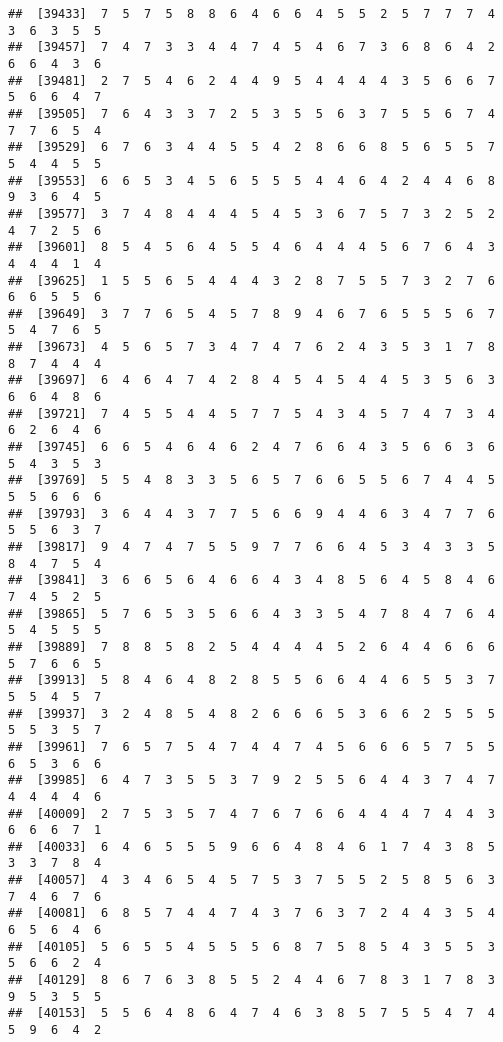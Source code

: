 \documentclass[
]{book}
\begin{document}
\begin{verbatim}
##  [39433]  7  5  7  5  8  8  6  4  6  6  4  5  5  2  5  7  7  7  4  3  6  3  5  5
##  [39457]  7  4  7  3  3  4  4  7  4  5  4  6  7  3  6  8  6  4  2  6  6  4  3  6
##  [39481]  2  7  5  4  6  2  4  4  9  5  4  4  4  4  3  5  6  6  7  5  6  6  4  7
##  [39505]  7  6  4  3  3  7  2  5  3  5  5  6  3  7  5  5  6  7  4  7  7  6  5  4
##  [39529]  6  7  6  3  4  4  5  5  4  2  8  6  6  8  5  6  5  5  7  5  4  4  5  5
##  [39553]  6  6  5  3  4  5  6  5  5  5  4  4  6  4  2  4  4  6  8  9  3  6  4  5
##  [39577]  3  7  4  8  4  4  4  5  4  5  3  6  7  5  7  3  2  5  2  4  7  2  5  6
##  [39601]  8  5  4  5  6  4  5  5  4  6  4  4  4  5  6  7  6  4  3  4  4  4  1  4
##  [39625]  1  5  5  6  5  4  4  4  3  2  8  7  5  5  7  3  2  7  6  6  6  5  5  6
##  [39649]  3  7  7  6  5  4  5  7  8  9  4  6  7  6  5  5  5  6  7  5  4  7  6  5
##  [39673]  4  5  6  5  7  3  4  7  4  7  6  2  4  3  5  3  1  7  8  8  7  4  4  4
##  [39697]  6  4  6  4  7  4  2  8  4  5  4  5  4  4  5  3  5  6  3  6  6  4  8  6
##  [39721]  7  4  5  5  4  4  5  7  7  5  4  3  4  5  7  4  7  3  4  6  2  6  4  6
##  [39745]  6  6  5  4  6  4  6  2  4  7  6  6  4  3  5  6  6  3  6  5  4  3  5  3
##  [39769]  5  5  4  8  3  3  5  6  5  7  6  6  5  5  6  7  4  4  5  5  5  6  6  6
##  [39793]  3  6  4  4  3  7  7  5  6  6  9  4  4  6  3  4  7  7  6  5  5  6  3  7
##  [39817]  9  4  7  4  7  5  5  9  7  7  6  6  4  5  3  4  3  3  5  8  4  7  5  4
##  [39841]  3  6  6  5  6  4  6  6  4  3  4  8  5  6  4  5  8  4  6  7  4  5  2  5
##  [39865]  5  7  6  5  3  5  6  6  4  3  3  5  4  7  8  4  7  6  4  5  4  5  5  5
##  [39889]  7  8  8  5  8  2  5  4  4  4  4  5  2  6  4  4  6  6  6  5  7  6  6  5
##  [39913]  5  8  4  6  4  8  2  8  5  5  6  6  4  4  6  5  5  3  7  5  5  4  5  7
##  [39937]  3  2  4  8  5  4  8  2  6  6  6  5  3  6  6  2  5  5  5  5  5  3  5  7
##  [39961]  7  6  5  7  5  4  7  4  4  7  4  5  6  6  6  5  7  5  5  6  5  3  6  6
##  [39985]  6  4  7  3  5  5  3  7  9  2  5  5  6  4  4  3  7  4  7  4  4  4  4  6
##  [40009]  2  7  5  3  5  7  4  7  6  7  6  6  4  4  4  7  4  4  3  6  6  6  7  1
##  [40033]  6  4  6  5  5  5  9  6  6  4  8  4  6  1  7  4  3  8  5  3  3  7  8  4
##  [40057]  4  3  4  6  5  4  5  7  5  3  7  5  5  2  5  8  5  6  3  7  4  6  7  6
##  [40081]  6  8  5  7  4  4  7  4  3  7  6  3  7  2  4  4  3  5  4  6  5  6  4  6
##  [40105]  5  6  5  5  4  5  5  5  6  8  7  5  8  5  4  3  5  5  3  5  6  6  2  4
##  [40129]  8  6  7  6  3  8  5  5  2  4  4  6  7  8  3  1  7  8  3  9  5  3  5  5
##  [40153]  5  5  6  4  8  6  4  7  4  6  3  8  5  7  5  5  4  7  4  5  9  6  4  2

\end{verbatim}
\end{document}
